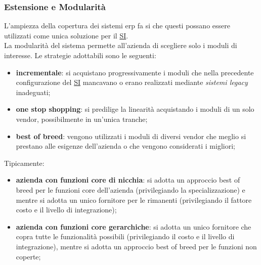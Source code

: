 \subsubsection{Estensione e Modularità}\label{sub:erp_estensione_e_modularit} %
L'ampiezza della copertura dei sistemi \ac{erp} fa si che questi possano essere utilizzati come unica soluzione per il \hyperref[sub:il_sistema_informativo]{SI}.
\\
La modularità del sistema permette all'azienda di scegliere solo i moduli di interesse.
Le strategie adottabili sono le seguenti:
\begin{itemize}
    \item \textbf{incrementale}: si acquistano progressivamente i moduli che nella precedente configurazione del \hyperref[def:si]{SI} mancavano o erano realizzati mediante \textit{sistemi legacy} inadeguati;
    \item \textbf{one stop shopping}: si predilige la linearità acquistando i moduli di un solo vendor, possibilmente in un'unica tranche;
    \item \textbf{best of breed}: vengono utilizzati i moduli di diversi vendor che meglio si prestano alle esigenze dell'azienda o che vengono considerati i migliori;
\end{itemize}
Tipicamente:
\begin{itemize}
    \item \textbf{azienda con funzioni core di nicchia}: si adotta un approccio best of breed per le funzioni core dell'azienda (privilegiando la specializzazione) e mentre si adotta un unico fornitore per le rimanenti (privilegiando il fattore costo e il livello di integrazione);
    \item \textbf{azienda con funzioni core gerarchiche}: si adotta un unico fornitore che copra tutte le funzionalità possibili (privilegiando il costo e il livello di integrazione), mentre si adotta un approccio best of breed per le funzioni non coperte;
\end{itemize}
%

